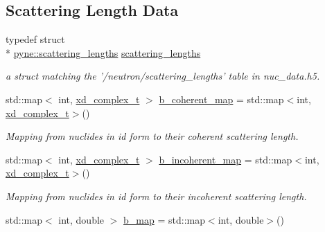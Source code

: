 \subsection*{Scattering Length Data}
\begin{DoxyCompactItemize}
\item 
\hypertarget{namespacepyne_a9a7904773bd3c8c5b8c4e10360c78c89}{typedef struct \\*
\hyperlink{structpyne_1_1scattering__lengths}{pyne\-::scattering\-\_\-lengths} \hyperlink{namespacepyne_a9a7904773bd3c8c5b8c4e10360c78c89}{scattering\-\_\-lengths}}\label{namespacepyne_a9a7904773bd3c8c5b8c4e10360c78c89}

\begin{DoxyCompactList}\small\item\em a struct matching the '/neutron/scattering\-\_\-lengths' table in nuc\-\_\-data.\-h5. \end{DoxyCompactList}\item 
\hypertarget{namespacepyne_a2bf1da1e7baf82a149d383b448cb4558}{std\-::map$<$ int, \hyperlink{structxd__complex__t}{xd\-\_\-complex\-\_\-t} $>$ \hyperlink{namespacepyne_a2bf1da1e7baf82a149d383b448cb4558}{b\-\_\-coherent\-\_\-map} = std\-::map$<$int, \hyperlink{structxd__complex__t}{xd\-\_\-complex\-\_\-t}$>$()}\label{namespacepyne_a2bf1da1e7baf82a149d383b448cb4558}

\begin{DoxyCompactList}\small\item\em Mapping from nuclides in id form to their coherent scattering length. \end{DoxyCompactList}\item 
\hypertarget{namespacepyne_a1206591ebb3e8305358495b8c8730b65}{std\-::map$<$ int, \hyperlink{structxd__complex__t}{xd\-\_\-complex\-\_\-t} $>$ \hyperlink{namespacepyne_a1206591ebb3e8305358495b8c8730b65}{b\-\_\-incoherent\-\_\-map} = std\-::map$<$int, \hyperlink{structxd__complex__t}{xd\-\_\-complex\-\_\-t}$>$()}\label{namespacepyne_a1206591ebb3e8305358495b8c8730b65}

\begin{DoxyCompactList}\small\item\em Mapping from nuclides in id form to their incoherent scattering length. \end{DoxyCompactList}\item 
\hypertarget{namespacepyne_ab4e41cc84fefb9085e62ad030a2b4ee6}{std\-::map$<$ int, double $>$ \hyperlink{namespacepyne_ab4e41cc84fefb9085e62ad030a2b4ee6}{b\-\_\-map} = std\-::map$<$int, double$>$()}\label{namespacepyne_ab4e41cc84fefb9085e62ad030a2b4ee6}


\end{DoxyCompactItemize}
